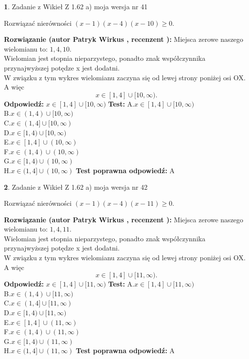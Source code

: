 \documentclass[12pt, a4paper]{article}
\theoremstyle{definition} %
\newtheorem{zad}{}
\newcommand{\zadStart}[1]{\begin{zad}#1\newline}
\newcommand{\zadStop}{\end{zad}}
\newcommand{\rozwStart}[2]{\noindent \textbf{Rozwiązanie (autor #1 , recenzent #2): }\newline}
\newcommand{\rozwStop}{\newline}
\newcommand{\odpStart}{\noindent \textbf{Odpowiedź:}\newline}
\newcommand{\odpStop}{\newline}
\newcommand{\testStart}{\noindent \textbf{Test:}\newline}
\newcommand{\testStop}{\newline}
\newcommand{\kluczStart}{\noindent \textbf{Test poprawna odpowiedź:}\newline}
\newcommand{\kluczStop}{\newline}
\begin{document}
\zadStart{Zadanie z Wikieł Z 1.62 a) moja wersja nr 41}

Rozwiązać nierówności $(x-1)(x-4)(x-10)\ge0$.
\zadStop
\rozwStart{Patryk Wirkus}{}
Miejsca zerowe naszego wielomianu to: $1, 4, 10$.\\
Wielomian jest stopnia nieparzystego, ponadto znak współczynnika przy\linebreak najwyższej potędze x jest dodatni.\\ W związku z tym wykres wielomianu zaczyna się od lewej strony poniżej osi OX. A więc $$x \in [1,4] \cup [10,\infty).$$
\rozwStop
\odpStart
$x \in [1,4] \cup [10,\infty)$
\odpStop
\testStart
A.$x \in [1,4] \cup [10,\infty)$\\
B.$x \in (1,4) \cup [10,\infty)$\\
C.$x \in (1,4] \cup [10,\infty)$\\
D.$x \in [1,4) \cup [10,\infty)$\\
E.$x \in [1,4] \cup (10,\infty)$\\
F.$x \in (1,4) \cup (10,\infty)$\\
G.$x \in [1,4) \cup (10,\infty)$\\
H.$x \in (1,4] \cup (10,\infty)$
\testStop
\kluczStart
A
\kluczStop



\zadStart{Zadanie z Wikieł Z 1.62 a) moja wersja nr 42}

Rozwiązać nierówności $(x-1)(x-4)(x-11)\ge0$.
\zadStop
\rozwStart{Patryk Wirkus}{}
Miejsca zerowe naszego wielomianu to: $1, 4, 11$.\\
Wielomian jest stopnia nieparzystego, ponadto znak współczynnika przy\linebreak najwyższej potędze x jest dodatni.\\ W związku z tym wykres wielomianu zaczyna się od lewej strony poniżej osi OX. A więc $$x \in [1,4] \cup [11,\infty).$$
\rozwStop
\odpStart
$x \in [1,4] \cup [11,\infty)$
\odpStop
\testStart
A.$x \in [1,4] \cup [11,\infty)$\\
B.$x \in (1,4) \cup [11,\infty)$\\
C.$x \in (1,4] \cup [11,\infty)$\\
D.$x \in [1,4) \cup [11,\infty)$\\
E.$x \in [1,4] \cup (11,\infty)$\\
F.$x \in (1,4) \cup (11,\infty)$\\
G.$x \in [1,4) \cup (11,\infty)$\\
H.$x \in (1,4] \cup (11,\infty)$
\testStop
\kluczStart
A
\kluczStop
\end{document}
